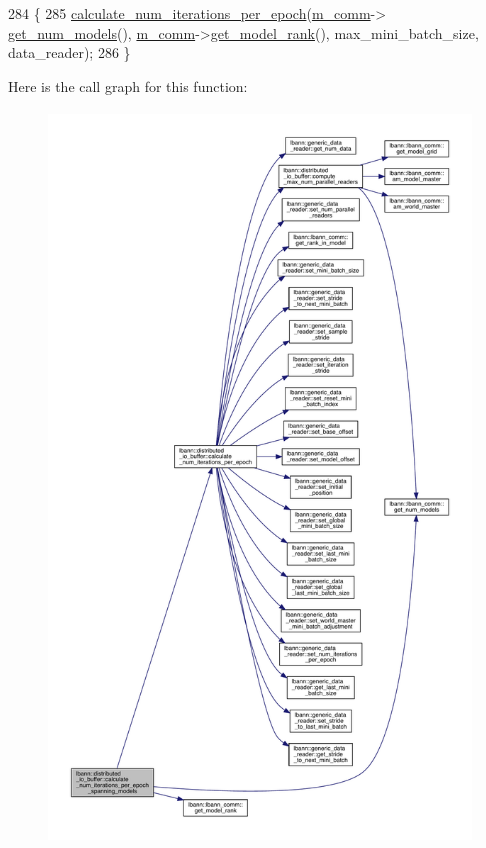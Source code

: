 \begin{DoxyCode}
284                                                                                                            
                                        \{
285   \hyperlink{classlbann_1_1distributed__io__buffer_af63a8b162ed869393c5b604c5913c631}{calculate\_num\_iterations\_per\_epoch}(\hyperlink{classlbann_1_1generic__io__buffer_a2e4a46c85c8b30e10b1cc5acaa2c4cca}{m\_comm}->
      \hyperlink{classlbann_1_1lbann__comm_aeb8ef8f13bbb324e3e1f656998198f3f}{get\_num\_models}(), \hyperlink{classlbann_1_1generic__io__buffer_a2e4a46c85c8b30e10b1cc5acaa2c4cca}{m\_comm}->\hyperlink{classlbann_1_1lbann__comm_a6422f70c92bed0b78179facc52b066f7}{get\_model\_rank}(), max\_mini\_batch\_size, 
      data\_reader);
286 \}
\end{DoxyCode}
Here is the call graph for this function\+:\nopagebreak
\begin{figure}[H]
\begin{center}
\leavevmode
\includegraphics[height=550pt]{classlbann_1_1distributed__io__buffer_aa1f5200f9646d38fe3b3adaf39645330_cgraph}
\end{center}
\end{figure}
